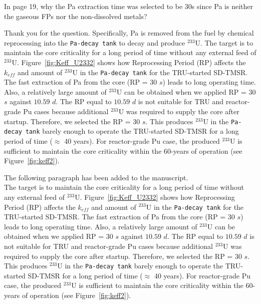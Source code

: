 \documentclass[answers,11pt]{exam}
\begin{document}
\begin{questions}
        \question In page 19, why the Pa extraction time was selected to be 30s since Pa is neither the gaseous FPs nor the non-dissolved metals?
        \begin{solution}
                  Thank you for the question. Specifically, Pa is removed from the fuel by chemical reprocessing into the \texttt{Pa-decay tank} to decay and produce $^{233}$U. The target is to maintain the core criticality for a long period of time without any external feed of $^{233}$U. Figure~\ref{fig:Keff_U2332} shows how Reprocessing Period (RP) affects the $k_{eff}$ and amount of $^{233}$U in the \texttt{Pa-decay tank} for the TRU-started SD-TMSR. The fast extraction of Pa from the core (RP = $30$ $s$) leads to long operating time. Also, a relatively large amount of $^{233}$U can be obtained when we applied RP = $30$ $s$ against $10.59$ $d$. The RP equal to $10.59$ $d$ is not suitable for TRU and reactor-grade Pu cases because additional $^{233}$U was required to supply the core after startup. Therefore, we selected the RP = $30$ $s$. This produces $^{233}$U in the \texttt{Pa-decay tank} barely enough to operate the TRU-started SD-TMSR for a long period of time ($\approx$ 40 years). For reactor-grade Pu case, the produced $^{233}$U is sufficient to maintain the core criticality within the 60-years of operation (see Figure~\ref{fig:keff2}).
                  
                  The following paragraph has been added to the manuscript.\\
                  
                  The target is to maintain the core criticality for a long period of time without any external feed of $^{233}$U. Figure~\ref{fig:Keff_U2332} shows how Reprocessing Period (RP) affects the $k_{eff}$ and amount of $^{233}$U in the \texttt{Pa-decay tank} for the TRU-started SD-TMSR. The fast extraction of Pa from the core (RP = $30$ $s$) leads to long operating time. Also, a relatively large amount of $^{233}$U can be obtained when we applied RP = $30$ $s$ against $10.59$ $d$. The RP equal to $10.59$ $d$ is not suitable for TRU and reactor-grade Pu cases because additional $^{233}$U was required to supply the core after startup. Therefore, we selected the RP = $30$ $s$. This produces $^{233}$U in the \texttt{Pa-decay tank} barely enough to operate the TRU-started SD-TMSR for a long period of time ($\approx$ 40 years). For reactor-grade Pu case, the produced $^{233}$U is sufficient to maintain the core criticality within the 60-years of operation (see Figure~\ref{fig:keff2}).
        \end{solution}


\end{questions}
\end{document}

